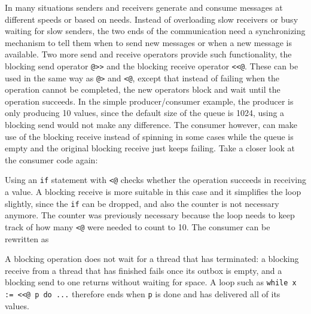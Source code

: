 In many situations senders and receivers generate and consume messages at
different speeds or based on needs. Instead of overloading slow receivers or
busy waiting for slow senders, the two ends of the communication need a
synchronizing mechanism to tell them when to send new messages or when a new
message is available. Two more send and receive operators provide such
functionality, the blocking send operator \texttt{@>{}>} and the blocking
receive operator \texttt{<{}<@}.  These can be used in the same way as
\texttt{@>} and \texttt{{<}@}, except that instead of failing when the operation
cannot be completed, the new operators block and wait until the operation
succeeds. In the simple producer/consumer example, the producer is only
producing 10 values, since the default size of the queue is 1024, using a
blocking send would not make any difference. The consumer however, can make use
of the blocking receive instead of spinning in some cases while the queue is
empty and the original blocking receive just keeps failing.  Take a closer look
at the consumer code again:


Using an \texttt{if} statement with \texttt{{<}@} checks whether the operation
succeeds in receiving a value. A blocking receive is more suitable in this case
and it simplifies the loop slightly, since the \texttt{if} can be dropped, and
also the counter is not necessary anymore. The counter was previously necessary
because the loop needs to keep track of how many \texttt{{<}@} were needed to
count to 10. The consumer can be rewritten as


A blocking operation does not wait for a thread that has terminated: a
blocking receive from a thread that has finished fails once its outbox is
empty, and a blocking send to one returns without waiting for space. A loop
such as \texttt{while x := {<}{<}@ p do ...} therefore ends when \texttt{p}
is done and has delivered all of its values.

